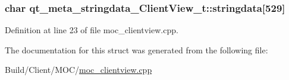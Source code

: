 \hypertarget{structqt__meta__stringdata___client_view__t_a0a268a2aad37e8237db18dbba34baf2a}{}
\subsubsection[{stringdata}]{\setlength{\rightskip}{0pt plus 5cm}char qt\+\_\+meta\+\_\+stringdata\+\_\+\+Client\+View\+\_\+t\+::stringdata\mbox{[}529\mbox{]}}\label{structqt__meta__stringdata___client_view__t_a0a268a2aad37e8237db18dbba34baf2a}


Definition at line 23 of file moc\+\_\+clientview.\+cpp.



The documentation for this struct was generated from the following file\+:\begin{DoxyCompactItemize}
\item 
Build/\+Client/\+M\+O\+C/\hyperlink{moc__clientview_8cpp}{moc\+\_\+clientview.\+cpp}\end{DoxyCompactItemize}
